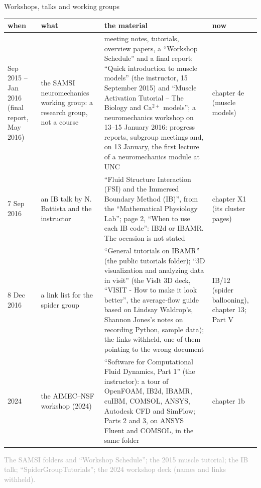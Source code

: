 \documentclass[aspectratio=169,11pt]{beamer}
\newcommand{\sourcecredit}[1]{\vfill\begin{flushright}\tiny\textcolor{DarkGray}{#1}\end{flushright}}
\begin{document}
\begin{frame}{Workshops, talks and working groups}
\label{fr:workshops}
\scriptsize
\renewcommand{\arraystretch}{1.08}
\setlength{\tabcolsep}{3pt}
\begin{tabular}{@{}L{0.11\textwidth}L{0.17\textwidth}L{0.55\textwidth}L{0.12\textwidth}@{}}
\toprule
when & what & the material & now \\
\midrule
Sep 2015 -- Jan 2016 (final report, May 2016) & the SAMSI neuromechanics working group: a research group, not a course & meeting notes, tutorials, overview papers, a ``Workshop Schedule'' and a final report; ``Quick introduction to muscle models'' (the instructor, 15 September 2015) and ``Muscle Activation Tutorial -- The Biology and Ca$^{2+}$ models''; a neuromechanics workshop on 13--15 January 2016: progress reports, subgroup meetings and, on 13 January, the first lecture of a neuromechanics module at UNC & chapter 4e (muscle models) \\
7 Sep 2016 & an IB talk by N. Battista and the instructor & ``Fluid Structure Interaction (FSI) and the Immersed Boundary Method (IB)'', from the ``Mathematical Physiology Lab''; page 2, ``When to use each IB code'': IB2d or IBAMR. The occasion is not stated & chapter X1 (its cluster pages) \\
8 Dec 2016 & a link list for the spider group & ``General tutorials on IBAMR'' (the public tutorials folder); ``3D visualization and analyzing data in visit'' (the VisIt 3D deck, ``VISIT - How to make it look better'', the average-flow guide based on Lindsay Waldrop's, Shannon Jones's notes on recording Python, sample data); the links withheld, one of them pointing to the wrong document & IB/12 (spider ballooning), chapter 13; Part V \\
2024 & the AIMEC--NSF workshop (2024) & ``Software for Computational Fluid Dynamics, Part 1'' (the instructor): a tour of OpenFOAM, IB2d, IBAMR, cuIBM, COMSOL, ANSYS, Autodesk CFD and SimFlow; Parts 2 and 3, on ANSYS Fluent and COMSOL, in the same folder & chapter 1b \\
\bottomrule
\end{tabular}
\sourcecredit{The SAMSI folders and ``Workshop Schedule''; the 2015 muscle tutorial; the IB talk; ``SpiderGroupTutorials''; the 2024 workshop deck (names and links withheld).}
\end{frame}
\end{document}
